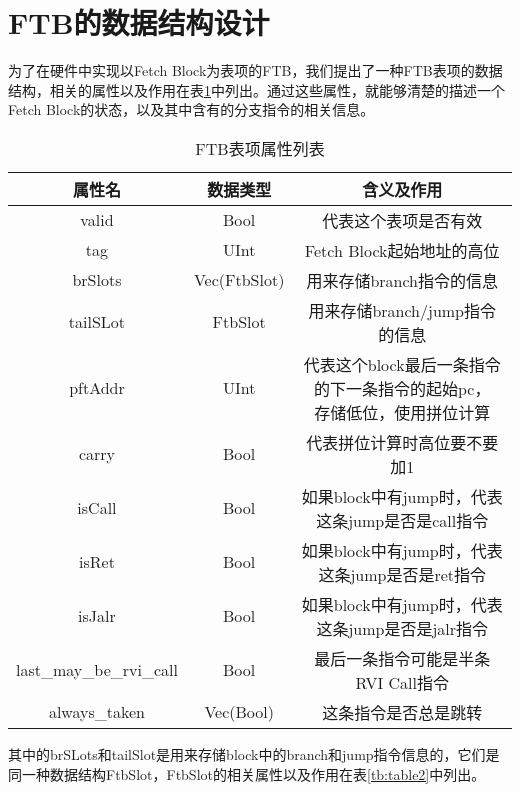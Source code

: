 \section{FTB的数据结构设计}


为了在硬件中实现以Fetch Block为表项的FTB，我们提出了一种FTB表项的数据结构，相关的属性以及作用在表\ref{tb:table1}中列出。通过这些属性，就能够清楚的描述一个Fetch Block的状态，以及其中含有的分支指令的相关信息。

\begin{table}[]
	\caption{FTB表项属性列表}
	\label{tb:table1}
	\centering
	\begin{tabular}{|c|c|c|}
		\hline
		属性名   & 数据类型   & 含义及作用   \\ \hline
		valid & Bool & 代表这个表项是否有效 \\ \hline
		tag & UInt & Fetch Block起始地址的高位 \\ \hline
		brSlots & Vec(FtbSlot) & 用来存储branch指令的信息 \\ \hline
		tailSLot & FtbSlot & 用来存储branch/jump指令的信息 \\ \hline
		pftAddr & UInt & \tabincell{c}{代表这个block最后一条指令的下一条指令的起始pc， \\ 存储低位，使用拼位计算} \\ \hline
		carry & Bool & 代表拼位计算时高位要不要加1 \\ \hline
		isCall & Bool & 如果block中有jump时，代表这条jump是否是call指令 \\ \hline
		isRet & Bool & 如果block中有jump时，代表这条jump是否是ret指令 \\ \hline
		isJalr & Bool & 如果block中有jump时，代表这条jump是否是jalr指令 \\ \hline
		last\_may\_be\_rvi\_call & Bool & 最后一条指令可能是半条RVI Call指令 \\ \hline
		always\_taken & Vec(Bool) & 这条指令是否总是跳转 \\ \hline
	\end{tabular}
\end{table}

其中的brSLots和tailSlot是用来存储block中的branch和jump指令信息的，它们是同一种数据结构FtbSlot，FtbSlot的相关属性以及作用在表\ref{tb:table2}中列出。

